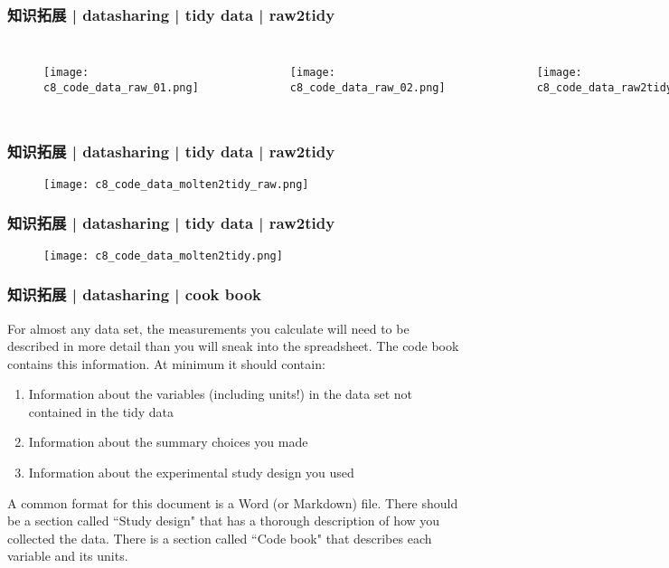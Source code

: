 \begin{frame}
  \frametitle{知识拓展 | datasharing | tidy data | raw2tidy}
  \begin{columns}
  \begin{figure}
    \centering
    \texttt{[image: c8\_code\_data\_raw\_01.png]}
  \end{figure}
  \begin{figure}
    \centering
    \texttt{[image: c8\_code\_data\_raw\_02.png]}
  \end{figure}
  \begin{figure}
    \centering
    \texttt{[image: c8\_code\_data\_raw2tidy.png]}
  \end{figure}
\end{columns}
\end{frame}

\begin{frame}
  \frametitle{知识拓展 | datasharing | tidy data | raw2tidy}
  \begin{figure}
    \centering
    \texttt{[image: c8\_code\_data\_molten2tidy\_raw.png]}
  \end{figure}
\end{frame}

\begin{frame}
  \frametitle{知识拓展 | datasharing | tidy data | raw2tidy}
  \begin{figure}
    \centering
    \texttt{[image: c8\_code\_data\_molten2tidy.png]}
  \end{figure}
\end{frame}

\begin{frame}
  \frametitle{知识拓展 | datasharing | cook book}
  For almost any data set, the measurements you calculate will need to be described in more detail than you will sneak into the spreadsheet.  The code book contains this information. At minimum it should contain:
  \begin{enumerate}
    \item Information about the variables (including units!) in the data set not contained in the tidy data
    \item Information about the summary choices you made
    \item Information about the experimental study design you used
  \end{enumerate}

  A common format for this document is a Word (or Markdown) file. There should be a section called ``Study design" that has a thorough description of how you collected the data. There is a section called ``Code book" that describes each variable and its units. 
\end{frame}

